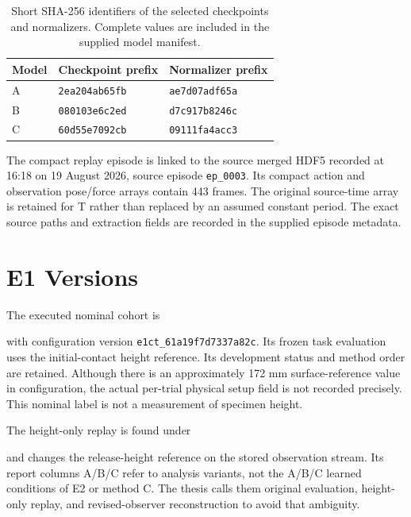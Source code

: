 \begin{table}[tbp]\centering\small
\caption[Selected model identifiers]{Short SHA-256 identifiers of the selected checkpoints and normalizers. Complete values are included in the supplied model manifest.}
\label{tab:model_provenance}
\begin{tabular}{lll}
\toprule Model & Checkpoint prefix & Normalizer prefix \\ \midrule
A & \texttt{2ea204ab65fb} & \texttt{ae7d07adf65a} \\
B & \texttt{080103e6c2ed} & \texttt{d7c917b8246c} \\
C & \texttt{60d55e7092cb} & \texttt{09111fa4acc3} \\
\bottomrule
\end{tabular}
\end{table}

The compact replay episode is linked to the source merged HDF5 recorded at 16:18 on 19 August 2026, source episode \texttt{ep\_0003}. Its compact action and observation pose/force arrays contain 443 frames. The original source-time array is retained for T rather than replaced by an assumed constant period. The exact source paths and extraction fields are recorded in the supplied episode metadata.

\section{E1 Versions}
The executed nominal cohort is
\begin{quote}\small{}\end{quote}
with configuration version \texttt{e1ct\_61a19f7d7337a82c}. Its frozen task evaluation uses the initial-contact height reference. Its development status and method order are retained. Although there is an approximately 172 mm surface-reference value in configuration, the actual per-trial physical setup field is not recorded precisely. This nominal label is not a measurement of specimen height.

The height-only replay is found under
\begin{quote}\small{}\end{quote}
and changes the release-height reference on the stored observation stream. Its report columns A/B/C refer to analysis variants, not the A/B/C learned conditions of E2 or method C. The thesis calls them original evaluation, height-only replay, and revised-observer reconstruction to avoid that ambiguity.

